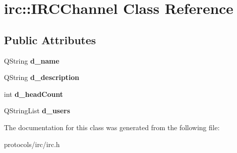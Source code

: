 \hypertarget{classirc_1_1IRCChannel}{
\section{irc::IRCChannel Class Reference}
\label{classirc_1_1IRCChannel}
}
\subsection*{Public Attributes}
\begin{DoxyCompactItemize}
\item 
\hypertarget{classirc_1_1IRCChannel_a4310391332e0e09d792aae41e7110e3a}{
QString {\bfseries d\_\-name}}
\label{classirc_1_1IRCChannel_a4310391332e0e09d792aae41e7110e3a}

\item 
\hypertarget{classirc_1_1IRCChannel_a76cf6dfa688d9029549ca09369bc32a0}{
QString {\bfseries d\_\-description}}
\label{classirc_1_1IRCChannel_a76cf6dfa688d9029549ca09369bc32a0}

\item 
\hypertarget{classirc_1_1IRCChannel_a4b50363dbeb46cc90324114e28cace24}{
int {\bfseries d\_\-headCount}}
\label{classirc_1_1IRCChannel_a4b50363dbeb46cc90324114e28cace24}

\item 
\hypertarget{classirc_1_1IRCChannel_af6d33bb978963b9abfc0fa03eebcc567}{
QStringList {\bfseries d\_\-users}}
\label{classirc_1_1IRCChannel_af6d33bb978963b9abfc0fa03eebcc567}

\end{DoxyCompactItemize}


The documentation for this class was generated from the following file:\begin{DoxyCompactItemize}
\item 
protocols/irc/irc.h\end{DoxyCompactItemize}
